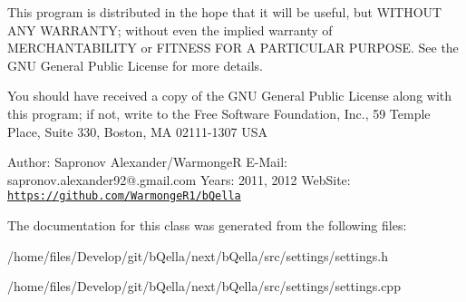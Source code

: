 This program is distributed in the hope that it will be useful, but WITHOUT ANY WARRANTY; without even the implied warranty of MERCHANTABILITY or FITNESS FOR A PARTICULAR PURPOSE. See the GNU General Public License for more details.

You should have received a copy of the GNU General Public License along with this program; if not, write to the Free Software Foundation, Inc., 59 Temple Place, Suite 330, Boston, MA 02111-\/1307 USA

Author: Sapronov Alexander/WarmongeR E-\/Mail: sapronov.alexander92@.gmail.com Years: 2011, 2012 WebSite: \href{https://github.com/WarmongeR1/bQella}{\tt https://github.com/WarmongeR1/bQella} 

The documentation for this class was generated from the following files:\begin{DoxyCompactItemize}
\item 
/home/files/Develop/git/bQella/next/bQella/src/settings/settings.h\item 
/home/files/Develop/git/bQella/next/bQella/src/settings/settings.cpp\end{DoxyCompactItemize}
